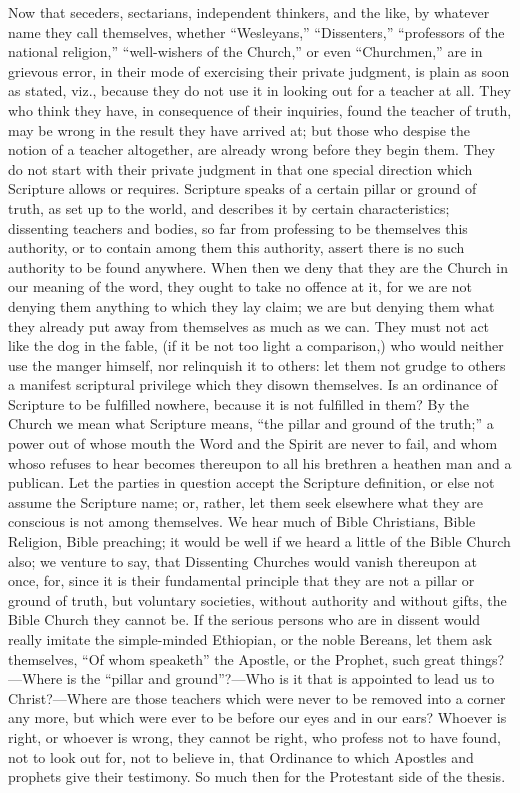 Now that seceders, sectarians, independent thinkers, and the like,
by whatever name they call themselves, whether ``Wesleyans,''
``Dissenters,'' ``professors of the national
religion,'' ``well-wishers of the Church,'' or even
``Churchmen,'' are in grievous error, in their mode of
exercising their private judgment, is plain as soon as stated, viz.,
because they do not use it in looking out for a teacher at all. They
who think they have, in consequence of their inquiries, found the
teacher of truth, may be wrong in the result they have arrived at; but
those who despise the notion of a teacher altogether, are already
wrong before they begin them. They do not start with their private
judgment in that one special direction which Scripture allows or
requires. Scripture speaks of a certain pillar or ground of truth, as
set up to the world, and describes it by certain characteristics;
dissenting teachers and bodies, so far from professing to be
themselves this authority, or to contain among them this authority,
assert there is no such authority to be found anywhere. When then we
deny that they are the Church in our meaning of the word, they ought
to take no offence at it, for we are not denying them anything to
which they lay claim; we are but denying them what they already put
away from themselves as much as we can. They must not act like the dog
in the fable, (if it be not too light a comparison,) who would neither
use the manger himself, nor relinquish it to others: let them not
grudge to others a manifest scriptural privilege which they disown
themselves. Is an ordinance of Scripture to be fulfilled nowhere,
because it is not fulfilled in them? By the Church we mean what
Scripture means, ``the pillar and ground of the truth;''
a power out of whose mouth the Word and the Spirit are never to fail,
and whom whoso refuses to hear becomes thereupon to all his brethren a
heathen man and a publican. Let the parties in question accept the
Scripture definition, or else not assume the Scripture name; or,
rather, let them seek elsewhere what they are conscious is not among
themselves. We hear much of Bible Christians, Bible Religion, Bible
preaching; it would be well if we heard a little of the Bible Church
also; we venture to say, that Dissenting Churches would vanish
thereupon at once, for, since it is their fundamental principle that
they are not a pillar or ground of truth, but voluntary societies,
without authority and without gifts, the Bible Church they cannot be.
If the serious persons who are in dissent would really imitate the
simple-minded Ethiopian, or the noble Bereans, let them ask
themselves, ``Of whom speaketh'' the Apostle, or the Prophet,
such great things?—Where is the ``pillar and ground''?—Who
is it that is appointed to lead us to Christ?—Where are those
teachers which were never to be removed into a corner any more, but
which were ever to be before our eyes and in our ears? Whoever is
right, or whoever is wrong, they cannot be right, who profess not to
have found, not to look out for, not to believe in, that Ordinance to
which Apostles and prophets give their testimony. So much then for the
Protestant side of the thesis.

